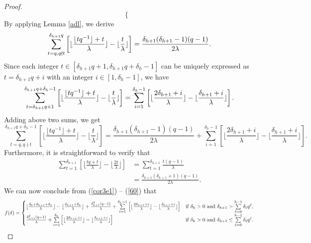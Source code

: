 \documentclass[journal,onecolumn]{IEEEtran}
\begin{document}
\begin{proof}
\begin{equation}
\begin{cases}
    \end{cases}
\end{equation}
By applying Lemma \ref{adl}, we derive \begin{equation}\notag
     \sum\limits_{t=q,q\nmid t}^{\delta_{h+1}q}\left[ \lfloor\frac{\lfloor tq^{-1}\rfloor+t}{\lambda}\rfloor - \lfloor\frac{t}{\lambda}\rfloor\right] =  \frac{\delta_{h+1}(\delta_{h+1}-1)(q-1)}{2\lambda}. 
\end{equation}
Since each integer $t\in \left[\delta_{h+1}q+1,\delta_{h+1}q+\delta_h-1\right]$ can be uniquely expressed as $t=\delta_{h+1}q+i$ with an integer $i\in \left[1,\delta_h-1\right]$,  we have 
    \begin{equation} \notag  \sum\limits_{t=\delta_{h+1}q+1}^{\delta_{h+1}q+\delta_h-1}\left[ \lfloor\frac{\lfloor tq^{-1}\rfloor+t}{\lambda}\rfloor - \lfloor\frac{t}{\lambda}\rfloor\right] =    \sum\limits_{i=1}^{\delta_h-1}\left[\lfloor \frac{2\delta_{h+1}+i}{\lambda}\rfloor - \lfloor \frac{\delta_{h+1}+i}{\lambda}\rfloor \right].
\end{equation}
Adding above two sums, we get  
\begin{equation}\label{59}
     \sum\limits_{t=q, q\nmid t}^{\delta_{h+1}q+\delta_{h}-1}\left[ \lfloor\frac{\lfloor tq^{-1}\rfloor+t}{\lambda}\rfloor - \lfloor\frac{t}{\lambda}\rfloor\right]= \frac{\delta_{h+1}(\delta_{h+1}-1)(q-1)}{2\lambda} + \sum\limits_{i=1}^{\delta_h-1}\left[\lfloor \frac{2\delta_{h+1}+i}{\lambda}\rfloor - \lfloor \frac{\delta_{h+1}+i}{\lambda}\rfloor \right].
\end{equation}
Furthermore, it is straightforward to verify that 
\begin{equation} \label{60}
\begin{split} 
\sum\limits_{t=1}^{\delta_{h+1}}\left[ \lfloor\frac{ tq+t}{\lambda}\rfloor - \lfloor\frac{2t}{\lambda}\rfloor\right]&= \sum\limits_{t=1}^{\delta_{h+1}}\frac{t(q-1)}{\lambda}\\
&= \frac{\delta_{h+1}(\delta_{h+1}+1)(q-1)}{2\lambda}. 
\end{split}
\end{equation}
We can now conclude from (\ref{cor3e1}) -- (\ref{60}) that 
\begin{equation}\notag
f(\delta)= 
\begin{cases} 
\lfloor\frac{\delta_0+\delta_{h+1}+\delta_h}{\lambda} \rfloor - \lfloor\frac{\delta_{h+1}+\delta_h}{\lambda} \rfloor  + \frac{\delta_{h+1}^2(q-1)}{\lambda}+\sum\limits_{i=1}^{\delta_h-1}\left[\lfloor \frac{2\delta_{h+1}+i}{\lambda}\rfloor - \lfloor \frac{\delta_{h+1}+i}{\lambda}\rfloor \right]&  \hbox{if } \delta_h>0\hbox{ and }\delta_{h+1}> \sum\limits_{\ell=0}^{h-1}\delta_{\ell}q^{\ell},\\
 \frac{\delta_{h+1}^2(q-1)}{\lambda}+\sum\limits_{i=1}^{\delta_h}\left[\lfloor \frac{2\delta_{h+1}+i}{\lambda}\rfloor - \lfloor \frac{\delta_{h+1}+i}{\lambda}\rfloor \right]&  \hbox{if } \delta_h>0\hbox{ and }\delta_{h+1}\leq  \sum\limits_{\ell=0}^{h-1}\delta_{\ell}q^{\ell}.
\end{cases}
\end{equation}


\end{proof}
\end{document}
